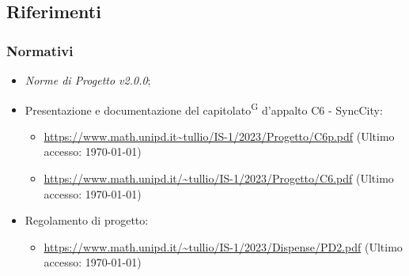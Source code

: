 \documentclass[8pt]{article}
\newcommand{\glossterm}[1]{#1\textsuperscript{G}} %
\begin{document}
\subsection{Riferimenti}
\subsubsection{Normativi}
\begin{itemize}
	\item \textit{Norme di Progetto v2.0.0};
	\item Presentazione e documentazione del \glossterm{capitolato} d’appalto C6 - SyncCity:
	\begin{itemize}
		\item \href{https://www.math.unipd.it/~tullio/IS-1/2023/Progetto/C6p.pdf}{\color{myblue}https://www.math.unipd.it\textasciitilde{}tullio/IS-1/2023/Progetto/C6p.pdf} (Ultimo accesso: \today)
		\item \href{https://www.math.unipd.it/~tullio/IS-1/2023/Progetto/C6.pdf}{\color{myblue}https://www.math.unipd.it/\textasciitilde{}tullio/IS-1/2023/Progetto/C6.pdf} (Ultimo accesso: \today)
	\end{itemize}
	\item Regolamento di progetto:
	\begin{itemize}
		\item \href{https://www.math.unipd.it/~tullio/IS-1/2023/Dispense/PD2.pdf}{\color{myblue}https://www.math.unipd.it/\textasciitilde{}tullio/IS-1/2023/Dispense/PD2.pdf} (Ultimo accesso: \today)
	\end{itemize}
\end{itemize}
\clearpage
\end{document}
